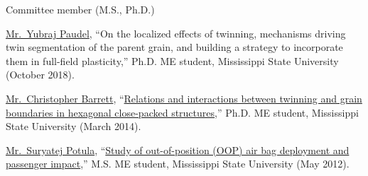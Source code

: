 Committee member (M.S., Ph.D.)
\begin{list2}
\vspace*{.05in}
\item
\href{https://www.researchgate.net/profile/Yubraj_Paudel}{Mr.~Yubraj Paudel}, ``On the localized effects of twinning, mechanisms driving twin segmentation of the parent grain, and building a strategy to incorporate them in full-field plasticity,'' Ph.D. ME student, Mississippi State University (October 2018).
\item
\href{http://scholar.google.com/citations?user=DMtfKn0AAAAJ&hl=en}{Mr.~Christopher Barrett}, ``\href{http://sun.library.msstate.edu/ETD-db/theses/available/etd-03212014-133222/}{Relations and interactions between twinning and grain boundaries in hexagonal close-packed structures},'' Ph.D. ME student, Mississippi State University (March 2014).
\item
\href{http://scholar.google.com/citations?user=8YpvYScAAAAJ&hl=en}{Mr.~Suryatej Potula}, ``\href{http://sun.library.msstate.edu/ETD-db/theses/available/etd-12092011-130158/}{Study of out-of-position (OOP) air bag deployment and passenger impact},'' M.S. ME student, Mississippi State University (May 2012).
\end{list2}

